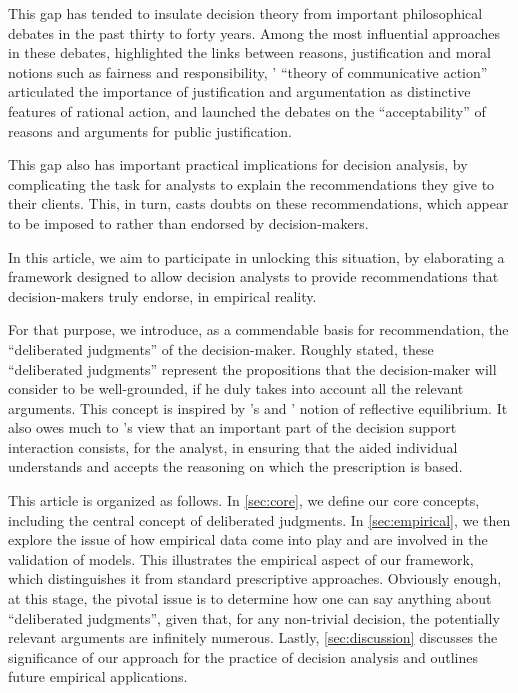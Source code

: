 \documentclass[version=3.21, pagesize, twoside=off, bibliography=totoc, DIV=calc, fontsize=12pt, a4paper]{scrartcl}
\begin{document}
This gap has tended to insulate decision theory from important philosophical debates in the past thirty to forty years. Among the most influential approaches in these debates, \citet{scanlon_what_2000} highlighted the links between reasons, justification and moral notions such as fairness and responsibility, \citeauthor{habermas_theorie_1981}’ \citeyearpar{habermas_theorie_1981} “theory of communicative action” articulated the importance of justification and argumentation as distinctive features of rational action, and \citet{rawls_political_2005} launched the debates on the “acceptability” \citep{estlund_democratic_2009} of reasons and arguments for public justification.

This gap also has important practical implications for decision analysis, by complicating the task for analysts to explain the recommendations they give to their clients. This, in turn, casts doubts on these recommendations, which appear to be imposed to rather than endorsed by decision-makers.

In this article, we aim to participate in unlocking this situation, by elaborating a framework designed to allow decision analysts to provide recommendations that decision-makers truly endorse, in empirical reality.

For that purpose, we introduce, as a commendable basis for recommendation, the “deliberated judgments” of the decision-maker. Roughly stated, these “deliberated judgments” represent the propositions that the decision-maker will consider to be well-grounded, if he duly takes into account all the relevant arguments. This concept is inspired by \citeauthor{goodman_fact_1983}’s \citeyearpar{goodman_fact_1983} and \citeauthor{rawls_theory_1999}’ \citeyearpar{rawls_theory_1999} notion of reflective equilibrium. It also owes much to \citeauthor{roy_multicriteria_1996}'s \citeyearpar{roy_multicriteria_1996} view that an important part of the decision support interaction consists, for the analyst, in ensuring that the aided individual understands and accepts the reasoning on which the prescription is based. 

This article is organized as follows. In \cref{sec:core}, we define our core concepts, including the central concept of deliberated judgments. In \cref{sec:empirical}, we then explore the issue of how empirical data come into play and are involved in the validation of models. This illustrates the empirical aspect of our framework, which distinguishes it from standard prescriptive approaches. Obviously enough, at this stage, the pivotal issue is to determine how one can say anything about “deliberated judgments”, given that, for any non-trivial decision, the potentially relevant arguments are infinitely numerous. Lastly, \cref{sec:discussion} discusses the significance of our approach for the practice of decision analysis and outlines future empirical applications. 
\end{document}
